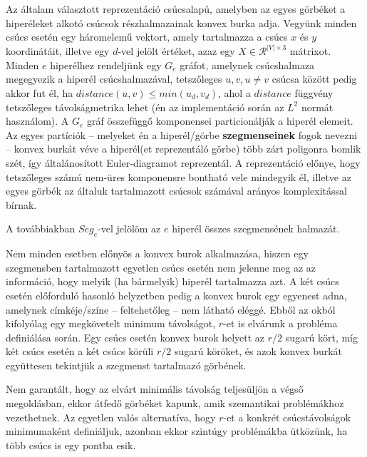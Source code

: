 Az általam választott reprezentáció csúcsalapú, amelyben az egyes görbéket a hiperéleket alkotó csúcsok részhalmazainak konvex burka adja. Vegyünk minden csúcs esetén egy háromelemű vektort, amely tartalmazza a csúcs $x$ és $y$ koordinátáit, illetve egy $d$-vel jelölt értéket, azaz egy $X \in \mathcal{R}^{|V| \times 3}$ mátrixot. Minden $e$ hiperélhez rendeljünk egy $G_e$ gráfot, amelynek csúcshalmaza megegyezik a hiperél csúcshalmazával, tetszőleges $u, v, u \neq v$ csúcsa között pedig akkor fut él, ha $distance(u, v) \leq min(u_d, v_d)$, ahol a $distance$ függvény tetszőleges távolságmetrika lehet (én az implementáció során az $L^2$ normát használom). A $G_e$ gráf összefüggő komponensei particionálják a hiperél elemeit. Az egyes partíciók -- melyeket én a hiperél/görbe \textbf{szegmenseinek} fogok nevezni -- konvex burkát véve a hiperél(et reprezentáló görbe) több zárt poligonra bomlik szét, így általánosított Euler-diagramot reprezentál. A reprezentáció előnye, hogy tetszőleges számú nem-üres komponensre bontható vele mindegyik él, illetve az egyes görbék az általuk tartalmazott csúcsok számával arányos komplexitással bírnak.

\begin{note}
A továbbiakban $Seg_{e}$-vel jelölöm az $e$ hiperél összes szegmensének halmazát.
\end{note}

Nem minden esetben előnyös a konvex burok alkalmazása, hiszen egy szegmensben tartalmazott egyetlen csúcs esetén nem jelenne meg az az információ, hogy melyik (ha bármelyik) hiperél tartalmazza azt. A két csúcs esetén előforduló hasonló helyzetben pedig a konvex burok egy egyenest adna, amelynek címkéje/színe -- feltehetőleg -- nem látható eléggé. Ebből az okból kifolyólag egy megkövetelt minimum távolságot, $r$-et is elvárunk a probléma definiálása során. Egy csúcs esetén konvex burok helyett az $r / 2$ sugarú kört, míg két csúcs esetén a két csúcs körüli $r / 2$ sugarú köröket, és azok konvex burkát együttesen tekintjük a szegmenst tartalmazó görbének.

\begin{note}
Nem garantált, hogy az elvárt minimális távolság teljesüljön a végső megoldásban, ekkor átfedő görbéket kapunk, amik szemantikai problémákhoz vezethetnek. Az egyetlen valós alternatíva, hogy $r$-et a konkrét csúcstávolságok minimumaként definiáljuk, azonban ekkor szintúgy problémákba ütközünk, ha több csúcs is egy pontba esik.
\end{note}

